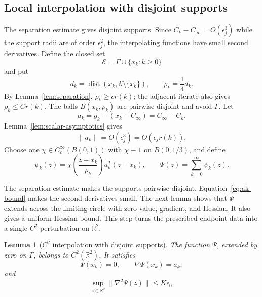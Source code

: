 \documentclass[11pt]{article}
\newtheorem{lemma}[theorem]{Lemma}
\newcommand{\R}{\mathbb R}
\begin{document}
\subsection{Local interpolation with disjoint supports}

The separation estimate gives disjoint supports.  Since
$C_k-C_\infty=O(\epsilon_j^3)$ while the support radii are of order
$\epsilon_j^2$, the interpolating functions have small second derivatives.
Define the closed set
\[
\mathcal E=\Gamma\cup\{x_k:k\ge0\}
\]
and put
\begin{equation}\label{eq:dk-rhok}
d_k=\operatorname{dist}(x_k,\mathcal E\setminus\{x_k\}),
\qquad \rho_k=\frac14d_k.
\end{equation}
By Lemma~\ref{lem:separation}, $\rho_k\ge c r(k)$; the adjacent iterate
also gives $\rho_k\le Cr(k)$.  The balls $B(x_k,\rho_k)$ are pairwise
disjoint and avoid $\Gamma$.  Let
\begin{equation}\label{eq:correction-vector}
a_k=g_k-(x_k-C_\infty)=C_\infty-C_k.
\end{equation}
Lemma~\ref{lem:scalar-asymptotics} gives
\begin{equation}\label{eq:ak-bound}
\|a_k\|=O(\epsilon_j^3)=O(\epsilon_jr(k)).
\end{equation}
Choose one $\chi\in C_c^\infty(B(0,1))$ with $\chi\equiv1$ on
$B(0,1/3)$, and define
\begin{equation}\label{eq:local-interpolants}
\psi_k(z)=
\chi\!\left(\frac{z-x_k}{\rho_k}\right)a_k^T(z-x_k),
\qquad
\Psi(z)=\sum_{k=0}^\infty\psi_k(z).
\end{equation}

The separation estimate makes the supports pairwise disjoint.
Equation~\eqref{eq:ak-bound} makes the second derivatives small.  The next
lemma shows that $\Psi$ extends across the limiting circle with zero value,
gradient, and Hessian.  It also gives a uniform Hessian bound.  This step turns
the prescribed endpoint data into a single $C^2$ perturbation on $\R^2$.

\begin{lemma}[$C^2$ interpolation with disjoint supports]
\label{lem:disjoint-interpolation}
The function $\Psi$, extended by zero on $\Gamma$, belongs to
$C^2(\R^2)$.  It satisfies
\begin{equation}\label{eq:interpolation-jets}
\Psi(x_k)=0,\qquad \nabla\Psi(x_k)=a_k,
\end{equation}
and
\begin{equation}\label{eq:interpolation-hessian-bound}
\sup_{z\in\R^2}\|\nabla^2\Psi(z)\|
\le K\epsilon_0.
\end{equation}
\end{lemma}
\end{document}

